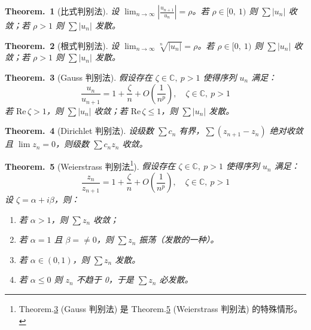 \documentclass[UTF8]{report}
\def\Re{\mathrm{Re\,}}
\def\C{\mathbb{C}}
\theoremstyle{MyLineTheoremStyle} %
\newtheorem{LineTheorem}{Theorem.\,}
\theoremstyle{MyBlockTheoremStyle} %
\newtheorem{BlockTheorem}[LineTheorem]{Theorem.\,} %
\theoremstyle{MySubsubsectionStyle} %
\begin{document}
\begin{LineTheorem}[比式判别法]\label{比式判别法}
    设 $\displaystyle \lim_{n \to \infty} \left| \frac{u_{n+1}}{u_n} \right|  = \rho$。若 $\rho \in [0,\ 1)$ 则 $\sum | u_n |$ 收敛；若 $\rho > 1$ 则 $\sum | u_n |$ 发散。
\end{LineTheorem}

\begin{LineTheorem}[根式判别法]\label{根式判别法}
    设 $\displaystyle \lim_{n \to \infty} \sqrt[n]{| u_n |}  = \rho$。若 $\rho \in [0,\ 1)$ 则 $\sum | u_n |$ 收敛；若 $\rho > 1$ 则 $\sum | u_n |$ 发散。
\end{LineTheorem}

\begin{LineTheorem}[Gauss 判别法]\label{Gauss 判别法}
假设存在 $\zeta \in \C, \ p > 1$ 使得序列 $u_n$ 满足：
\begin{equation}
    \frac{u_n}{u_{n+1}} = 1 + \frac{\zeta}{n} + O\left( \frac{1}{n^p} \right),\quad \zeta \in \C, \ p > 1
\end{equation}
若 $\Re \zeta > 1$，则 $\sum | u_n |$ 收敛；若 $\Re \zeta \leqslant 1$，则 $\sum | u_n |$ 发散。
\end{LineTheorem}

\begin{LineTheorem}[Dirichlet 判别法]\label{Dirichlet 判别法}
    设级数 $\sum c_n$ 有界，$\sum \left(z_{n+1} - z_{n}\right)$ 绝对收敛且 $\lim z_n = 0$，则级数 $\sum c_n z_n$ 收敛。
\end{LineTheorem}

\begin{BlockTheorem}[Weierstrass 判别法\footnote{Theorem.\ref{Gauss 判别法} (Gauss 判别法) 是 Theorem.\ref{Weierstrass 判别法} (Weierstrass 判别法) 的特殊情形。}]\label{Weierstrass 判别法}
    假设存在 $\zeta \in \C, \ p > 1$ 使得序列 $u_n$ 满足：
    \begin{equation}
        \frac{z_n}{z_{n+1}} = 1 + \frac{\zeta}{n} + O\left( \frac{1}{n^p} \right),\quad \zeta \in \C, \ p > 1
    \end{equation}
    设 $\zeta = \alpha + i\beta$，则：
    \begin{enumerate}
    \item 若 $\alpha > 1$，则 $\sum z_n$ 收敛；
    \item 若 $\alpha = 1$ 且 $\beta = \ne 0$，则 $\sum z_n$ 振荡（发散的一种）。
    \item 若 $\alpha \in (0,1)$，则 $\sum z_n$ 发散。
    \item 若 $\alpha \leqslant 0$ 则 $z_n$ 不趋于 0，于是 $\sum z_n$ 必发散。
    \end{enumerate}
\end{BlockTheorem}
\end{document}
